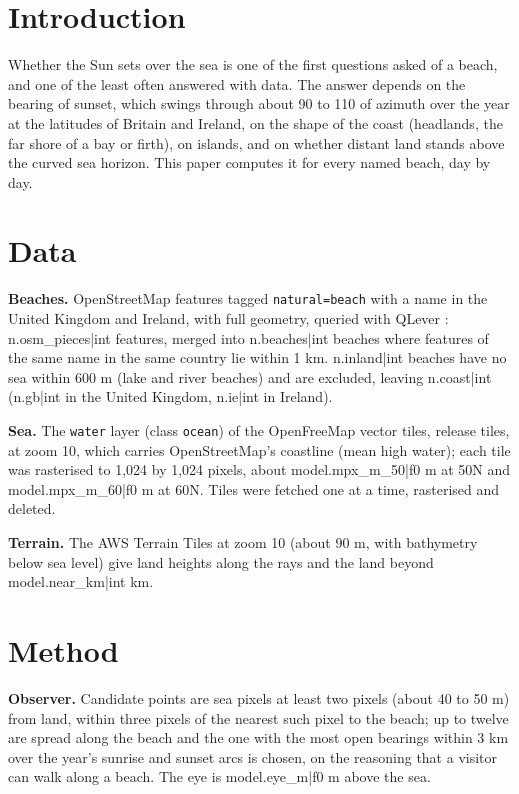 \documentclass[11pt,a4paper]{article}
\begin{document}
\section{Introduction}
Whether the Sun sets over the sea is one of the first questions asked of a beach, and one of the least often answered with data. The answer depends on the bearing of sunset, which swings through about 90 to 110\textdegree{} of azimuth over the year at the latitudes of Britain and Ireland, on the shape of the coast (headlands, the far shore of a bay or firth), on islands, and on whether distant land stands above the curved sea horizon. This paper computes it for every named beach, day by day.

\section{Data}
\textbf{Beaches.} OpenStreetMap \citep{osm} features tagged \texttt{natural=beach} with a name in the United Kingdom and Ireland, with full geometry, queried with QLever \citep{qlever}: {{n.osm_pieces|int}} features, merged into {{n.beaches|int}} beaches where features of the same name in the same country lie within 1 km. {{n.inland|int}} beaches have no sea within 600 m (lake and river beaches) and are excluded, leaving {{n.coast|int}} ({{n.gb|int}} in the United Kingdom, {{n.ie|int}} in Ireland).

\textbf{Sea.} The \texttt{water} layer (class \texttt{ocean}) of the OpenFreeMap \citep{openfreemap} vector tiles, release {{tiles}}, at zoom 10, which carries OpenStreetMap's coastline (mean high water); each tile was rasterised to 1,024 by 1,024 pixels, about {{model.mpx_m_50|f0}} m at 50\textdegree N and {{model.mpx_m_60|f0}} m at 60\textdegree N. Tiles were fetched one at a time, rasterised and deleted.

\textbf{Terrain.} The AWS Terrain Tiles at zoom 10 (about 90 m, with bathymetry below sea level) give land heights along the rays and the land beyond {{model.near_km|int}} km.

\section{Method}
\textbf{Observer.} Candidate points are sea pixels at least two pixels (about 40 to 50 m) from land, within three pixels of the nearest such pixel to the beach; up to twelve are spread along the beach and the one with the most open bearings within 3 km over the year's sunrise and sunset arcs is chosen, on the reasoning that a visitor can walk along a beach. The eye is {{model.eye_m|f0}} m above the sea.
\end{document}

